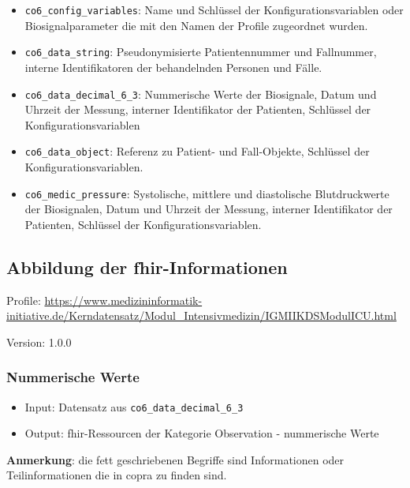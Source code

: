 \begin{itemize}
  \item \texttt{co6\_config\_variables}: Name und Schlüssel der Konfigurationsvariablen oder Biosignalparameter die mit den Namen der Profile zugeordnet wurden.
  \item \texttt{co6\_data\_string}: Pseudonymisierte Patientennummer und Fallnummer, interne Identifikatoren der behandelnden Personen und Fälle.
  \item \texttt{co6\_data\_decimal\_6\_3}: Nummerische Werte der Biosignale, Datum und Uhrzeit der Messung, interner Identifikator der Patienten, Schlüssel der Konfigurationsvariablen
  \item \texttt{co6\_data\_object}: Referenz zu Patient- und Fall-Objekte, Schlüssel der Konfigurationsvariablen.
  \item \texttt{co6\_medic\_pressure}: Systolische, mittlere und diastolische Blutdruckwerte der Biosignalen, Datum und Uhrzeit der Messung, interner Identifikator der Patienten, Schlüssel der Konfigurationsvariablen.
\end{itemize}
\vspace{4mm}

\subsection{Abbildung der \acs{fhir}-Informationen} \label{subsec:coprareflexfhir}

\noindent Profile: \url{https://www.medizininformatik-initiative.de/Kerndatensatz/Modul_Intensivmedizin/IGMIIKDSModulICU.html}

\noindent Version: 1.0.0

\subsubsection{Nummerische Werte} \label{subsub:numbvalues}
\begin{itemize}
\item Input: Datensatz aus \texttt{co6\_data\_decimal\_6\_3}

\item Output: \ac{fhir}-Ressourcen der Kategorie \glqq Observation\grqq{} - nummerische Werte
\end{itemize}

\noindent \textbf{Anmerkung}: die fett geschriebenen Begriffe sind Informationen oder Teilinformationen die in \ac{copra} zu finden sind. 

